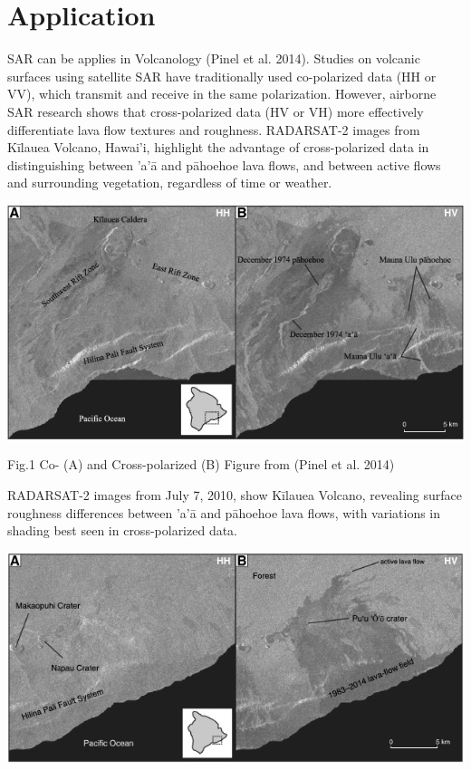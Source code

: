 \documentclass[
  letterpaper,
  DIV=11,
  numbers=noendperiod]{scrreprt}
\begin{document}
\chapter{Application}\label{application-5}

SAR can be applies in Volcanology (Pinel et al. 2014). Studies on
volcanic surfaces using satellite SAR have traditionally used
co-polarized data (HH or VV), which transmit and receive in the same
polarization. However, airborne SAR research shows that cross-polarized
data (HV or VH) more effectively differentiate lava flow textures and
roughness. RADARSAT-2 images from Kīlauea Volcano, Hawai'i, highlight
the advantage of cross-polarized data in distinguishing between 'a'ā and
pāhoehoe lava flows, and between active flows and surrounding
vegetation, regardless of time or weather.

\includegraphics{Cross-polarized1.png}

Fig.1 Co- (A) and Cross-polarized (B) Figure from (Pinel et al. 2014)

RADARSAT-2 images from July 7, 2010, show Kīlauea Volcano, revealing
surface roughness differences between 'a'ā and pāhoehoe lava flows, with
variations in shading best seen in cross-polarized data.

\includegraphics{Cross-polarized2.png}
\end{document}
